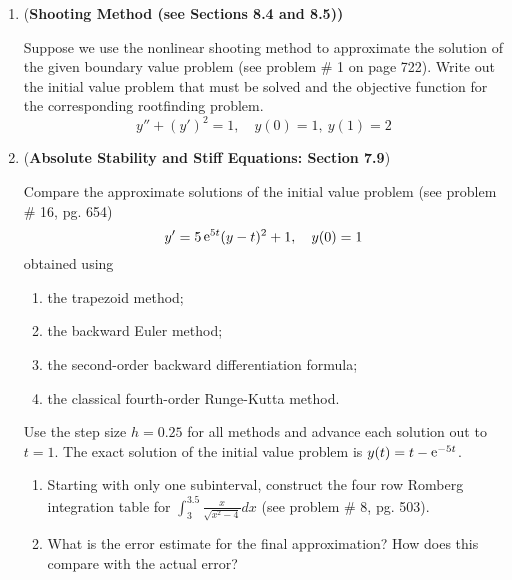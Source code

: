 \documentclass [12pt]{article}
\begin{document}
\begin{enumerate}
{\bf Suggested  /  Additional Problems for Math 529 / Phys 528 students}:

\item {(\bf Shooting Method (see Sections 8.4 and 8.5))}

Suppose we use the nonlinear shooting method to approximate the solution of the given boundary value problem (see problem \# 1 on page 722). Write out the initial value problem that must be solved and the objective function for the corresponding rootfinding problem.
%
\[
y''+(y')^2=1, \quad y(0)=1, \ y(1)=2
\]



\item {({\bf Absolute Stability and Stiff Equations: Section 7.9})}

Compare the approximate solutions of the initial value problem (see problem \# 16, pg. 654)
%
\[
y'=5\mathop{\rm e}\nolimits^{5t}(y-t)^2+1, \quad y(0)=1
\]
%
obtained using

\begin{enumerate}

\item the trapezoid method;

\item the backward Euler method;

\item the second-order backward differentiation formula;

\item the classical fourth-order Runge-Kutta method.

\end{enumerate}

Use the step size $h=0.25$ for all methods and advance each solution out to $t=1$. The exact solution of the initial value problem is $y(t)=t-\mathop{\rm e}\nolimits^{-5t}$.

\begin{enumerate}

\item Starting with only one subinterval, construct the four row  Romberg integration table for $\int_{3}^{3.5} \frac{x}{\sqrt{x^2-4}}dx$ (see problem \# 8, pg. 503).

\item What is the error estimate for the final approximation? How does this compare with the actual error?


\end{enumerate}
\end{enumerate}
\end{document}
